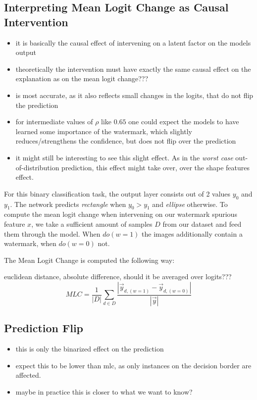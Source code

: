 \subsection{Interpreting Mean Logit Change as Causal Intervention}
\begin{itemize}
    \item it is basically the causal effect of intervening on a latent factor on the models output
    \item theoretically the intervention must have exactly the same causal effect on the explanation as on the mean logit change???
    \item is most accurate, as it also reflects small changes in the logits, that do not flip the prediction
    \item for intermediate values of $\rho$ like $0.65$ one could expect the models to have learned some importance of the watermark, which slightly reduces/strengthens the confidence, but does not flip over the prediction
    \item it might still be interesting to see this slight effect. As in the \textit{worst case} out-of-distribution prediction, this effect might take over, over the shape features effect. 
\end{itemize}
For this binary classification task, the output layer consists out of 2 values $y_0$ and $y_1$. The network predicts \textit{rectangle} when $y_0 > y_1$ and \textit{ellipse} otherwise. To compute the mean logit change when intervening on our watermark spurious feature $x$, we take a sufficient amount of samples $D$ from our dataset and feed them through the model. When $do(w=1)$ the images additionally contain a watermark, when $do(w=0)$ not. 

The Mean Logit Change is computed the following way:

euclidean distance, absolute difference, should it be averaged over logits???
\begin{equation}
\displaystyle 
MLC =\frac{1}{|D|} \sum_{d \in D} \frac{|\vec{y}_{d, (w=1)}- \vec{y}_{d, (w=0)} |}{|\vec{y}|}
\end{equation}

\subsection{Prediction Flip}
\begin{itemize}
    \item this is only the binarized effect on the prediction
    \item expect this to be lower than mlc, as only instances on the decision border are affected. 
    \item maybe in practice this is closer to what we want to know?
\end{itemize}

